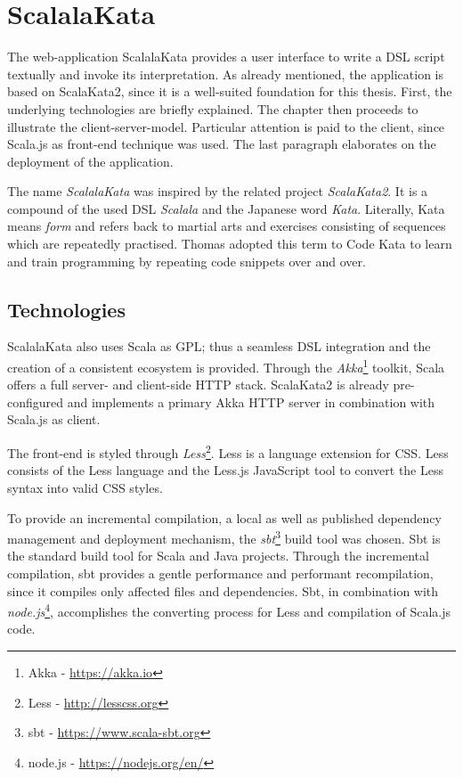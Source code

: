 \section{ScalalaKata}
\label{IMPL_SCALALAKATA}
The web-application ScalalaKata provides a user interface to write a DSL script textually and invoke its interpretation. As already mentioned, the application is based on ScalaKata2, since it is a well-suited foundation for this thesis. First, the underlying technologies are briefly explained. The chapter then proceeds to illustrate the client-server-model. Particular attention is paid to the client, since Scala.js as front-end technique was used. The last paragraph elaborates on the deployment of the application.

The name \textit{ScalalaKata} was inspired by the related project \textit{ScalaKata2}. It is a compound of the used DSL \textit{Scalala} and the Japanese word \textit{Kata}. Literally, Kata means \textit{form} and refers back to martial arts and exercises consisting of sequences which are repeatedly practised. Thomas adopted this term to Code Kata to learn and train programming by repeating code snippets over and over.\cite{Thomas2013}

\subsection{Technologies}
\label{IMPL_SCALALAKATA_TECHS}
ScalalaKata also uses Scala as GPL; thus a seamless DSL integration and the creation of a consistent ecosystem is provided. Through the \textit{Akka}\footnote{Akka - \url{https://akka.io}} toolkit, Scala offers a full server- and client-side HTTP stack. ScalaKata2 is already pre-configured and implements a primary Akka HTTP server in combination with Scala.js as client.

The front-end is styled through \textit{Less}\footnote{Less - \url{http://lesscss.org}}. Less is a language extension for CSS. Less consists of the Less language and the Less.js JavaScript tool to convert the Less syntax into valid CSS styles.\cite{Lesscss.org}

To provide an incremental compilation, a local as well as published dependency management and deployment mechanism, the \textit{sbt}\footnote{sbt - \url{https://www.scala-sbt.org}} build tool was chosen. Sbt is the standard build tool for Scala and Java projects. Through the incremental compilation, sbt provides a gentle performance and performant recompilation, since it compiles only affected files and dependencies.\cite{LIGHTBENDINC} Sbt, in combination with \textit{node.js}\footnote{node.js - \url{https://nodejs.org/en/}}, accomplishes the converting process for Less and compilation of Scala.js code.

